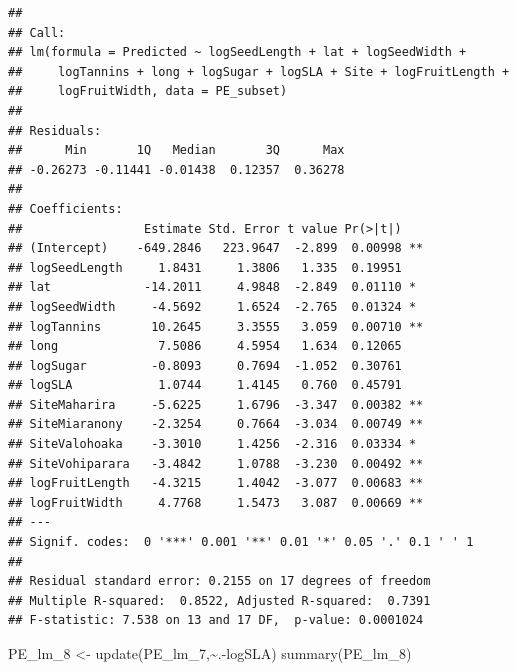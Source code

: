 \documentclass[
  12pt,
]{article}
\newenvironment{Shaded}{\begin{snugshade}}{\end{snugshade}}
\newcommand{\FunctionTok}[1]{\textcolor[rgb]{0.00,0.00,0.00}{#1}}
\newcommand{\NormalTok}[1]{#1}
\newcommand{\OtherTok}[1]{\textcolor[rgb]{0.56,0.35,0.01}{#1}}
\newcommand{\SpecialCharTok}[1]{\textcolor[rgb]{0.00,0.00,0.00}{#1}}
\begin{document}
\begin{verbatim}
## 
## Call:
## lm(formula = Predicted ~ logSeedLength + lat + logSeedWidth + 
##     logTannins + long + logSugar + logSLA + Site + logFruitLength + 
##     logFruitWidth, data = PE_subset)
## 
## Residuals:
##      Min       1Q   Median       3Q      Max 
## -0.26273 -0.11441 -0.01438  0.12357  0.36278 
## 
## Coefficients:
##                 Estimate Std. Error t value Pr(>|t|)   
## (Intercept)    -649.2846   223.9647  -2.899  0.00998 **
## logSeedLength     1.8431     1.3806   1.335  0.19951   
## lat             -14.2011     4.9848  -2.849  0.01110 * 
## logSeedWidth     -4.5692     1.6524  -2.765  0.01324 * 
## logTannins       10.2645     3.3555   3.059  0.00710 **
## long              7.5086     4.5954   1.634  0.12065   
## logSugar         -0.8093     0.7694  -1.052  0.30761   
## logSLA            1.0744     1.4145   0.760  0.45791   
## SiteMaharira     -5.6225     1.6796  -3.347  0.00382 **
## SiteMiaranony    -2.3254     0.7664  -3.034  0.00749 **
## SiteValohoaka    -3.3010     1.4256  -2.316  0.03334 * 
## SiteVohiparara   -3.4842     1.0788  -3.230  0.00492 **
## logFruitLength   -4.3215     1.4042  -3.077  0.00683 **
## logFruitWidth     4.7768     1.5473   3.087  0.00669 **
## ---
## Signif. codes:  0 '***' 0.001 '**' 0.01 '*' 0.05 '.' 0.1 ' ' 1
## 
## Residual standard error: 0.2155 on 17 degrees of freedom
## Multiple R-squared:  0.8522, Adjusted R-squared:  0.7391 
## F-statistic: 7.538 on 13 and 17 DF,  p-value: 0.0001024
\end{verbatim}

\begin{Shaded}
\begin{Highlighting}[]
\NormalTok{PE\_lm\_8 }\OtherTok{\textless{}{-}} \FunctionTok{update}\NormalTok{(PE\_lm\_7,}\SpecialCharTok{\textasciitilde{}}\NormalTok{.}\SpecialCharTok{{-}}\NormalTok{logSLA)}
\FunctionTok{summary}\NormalTok{(PE\_lm\_8)}
\end{Highlighting}
\end{Shaded}
\end{document}
